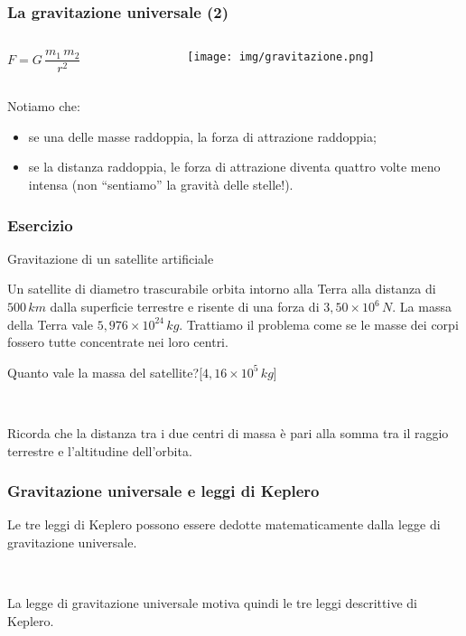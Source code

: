 \documentclass[]{beamer}
\theoremstyle{plain}
\begin{document}
\begin{frame}
\frametitle{La gravitazione universale (2)}
\begin{columns}
\begin{column}{0.3\textwidth}
\begin{center}
\colorbox{marroncino!30}{$ F = G \,  \dfrac{m_1 \, m_2}{r^2} $}
\end{center}
\end{column}
\begin{column}{0.5\textwidth}
\begin{figure}
\texttt{[image: img/gravitazione.png]}
\end{figure}
\end{column}
\end{columns}\pause

Notiamo che:
\begin{itemize}
  \item se una delle masse raddoppia, la forza di attrazione raddoppia;\pause
  \item se la distanza raddoppia, le forza di attrazione diventa quattro volte meno intensa (non ``sentiamo'' la gravità delle stelle!).
\end{itemize}
\end{frame}



\begin{frame}
\frametitle{Esercizio}
\begin{exampleblock}{Gravitazione di un satellite artificiale}
  \small{Un satellite di diametro trascurabile orbita intorno alla Terra alla distanza di $ 500 \, km $ dalla superficie terrestre e risente di una forza di $ 3,50 \times 10^{6} \, N $. La massa della Terra vale $ 5,976 \times 10^{24} \, kg $. Trattiamo il problema come se le masse dei corpi fossero tutte concentrate nei loro centri. 

  Quanto vale la massa del satellite?\hspace*{\fill}[$ 4,16 \times 10^{5} \, kg $]}
\end{exampleblock}\pause

~

Ricorda che la distanza tra i due centri di massa è pari alla somma tra il raggio terrestre e l'altitudine dell'orbita.
\end{frame}



\begin{frame}
\frametitle{Gravitazione universale e leggi di Keplero}
Le tre leggi di Keplero possono essere dedotte matematicamente dalla legge di gravitazione universale.\pause

~

La legge di gravitazione universale motiva quindi le tre leggi descrittive di Keplero.
\end{frame}
\end{document}
